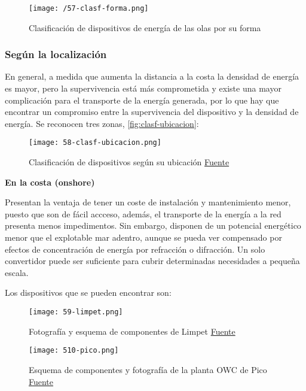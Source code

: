 \begin{figure}
\centering
\texttt{[image: /57-clasf-forma.png]}
\caption{Clasificación de dispositivos de energía de las olas por su forma}
\label{fig:clasf-forma}
\end{figure}

\subsubsection{Según la localización}\label{header-n123}

En general, a medida que aumenta la distancia a la costa la densidad de
energía es mayor, pero la supervivencia está más comprometida y existe
una mayor complicación para el transporte de la energía generada, por lo
que hay que encontrar un compromiso entre la supervivencia del
dispositivo y la densidad de energía. Se reconocen tres zonas, \autoref{fig:clasf-ubicacion}:

\begin{figure}
\centering
\texttt{[image: 58-clasf-ubicacion.png]}
\caption[Clasificación de dispositivos según su ubicación]{Clasificación de dispositivos según su ubicación \href{https://revista-anales.icai.es/web/n_14/seccion_8.html}{Fuente}}
\label{fig:clasf-ubicacion}
\end{figure}

\textbf{En la costa (onshore)}

Presentan la ventaja de tener un coste de instalación y mantenimiento
menor, puesto que son de fácil accceso, además, el transporte de la
energía a la red presenta menos impedimentos. Sin embargo, disponen de
un potencial energético menor que el explotable mar adentro, aunque se
pueda ver compensado por efectos de concentración de energía por
refracción o difracción. Un solo convertidor puede ser suficiente para
cubrir determinadas necesidades a pequeña escala.

Los dispositivos que se pueden encontrar son:

\begin{figure}
\centering
\texttt{[image: 59-limpet.png]}
\caption[Fotografía y esquema de componentes de Limpet]{Fotografía y esquema de componentes de Limpet \href{www.wavegen.co.uk}{Fuente}}
\label{fig:limpet}
\end{figure}

\begin{figure}
\centering
\texttt{[image: 510-pico.png]}
\caption[Esquema de componentes y fotografía de la planta OWC de Pico]{Esquema de componentes y fotografía de la planta OWC de Pico \href{www.pico-owc.net}{Fuente}}
\label{fig:pico}
\end{figure}

